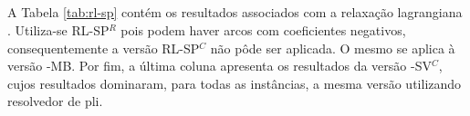\subsection{\rlu}

A  Tabela  \ref{tab:rl-sp}  contém  os resultados  associados  com  a  relaxação
lagrangiana {\rlu}. Utiliza-se RL-SP$^R$ pois podem haver arcos com coeficientes
negativos, consequentemente a versão RL-SP$^C$ não pôde ser aplicada. O mesmo se
aplica à versão  {\rlu}-MB. Por fim, a última coluna  apresenta os resultados da
versão {\rlu}-SV$^C$,  cujos resultados dominaram,  para todas as  instâncias, a
mesma versão utilizando resolvedor de \gls{pli}.

\begin{table}[!ht]
\centering
{}
\end{table}
